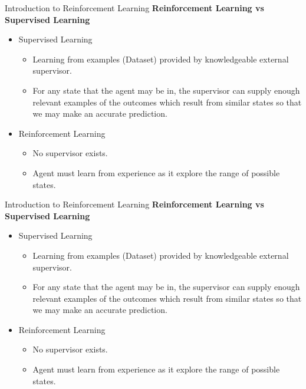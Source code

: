 \documentclass{beamer}
\begin{document}
\begin{frame}[t]{Introduction to Reinforcement Learning} %
\textbf{Reinforcement Learning vs Supervised Learning}
\begin{itemize}
\item Supervised Learning
	\begin{itemize}
	\item Learning from examples (Dataset) provided by knowledgeable external supervisor.
	\item For any state that the agent may be in, the supervisor can supply enough relevant examples of the outcomes which result from similar states so that we may make an accurate prediction.
	\end{itemize}
\item Reinforcement Learning
	\begin{itemize}
	\item No supervisor exists.
	\item Agent must learn from experience as it explore the range of possible states.
	\end{itemize}
\end{itemize}
\end{frame}


\begin{frame}[t]{Introduction to Reinforcement Learning} %
\textbf{Reinforcement Learning vs Supervised Learning}
\begin{itemize}
\item Supervised Learning
	\begin{itemize}
	\item Learning from examples (Dataset) provided by knowledgeable external supervisor.
	\item For any state that the agent may be in, the supervisor can supply enough relevant examples of the outcomes which result from similar states so that we may make an accurate prediction.
	\end{itemize}
\item Reinforcement Learning
	\begin{itemize}
	\item No supervisor exists.
	\item Agent must learn from experience as it explore the range of possible states.
	\end{itemize}
\end{itemize}
\end{frame}
\end{document}
